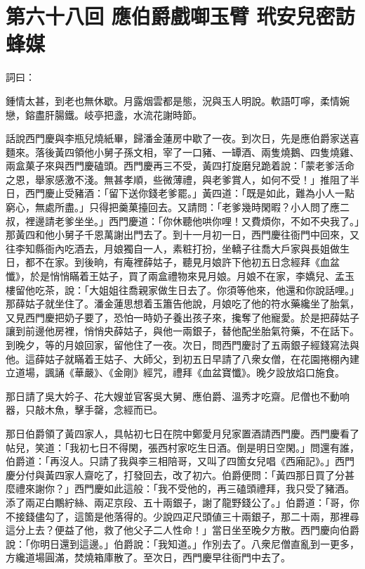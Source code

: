 
\chapter*{第六十八回 應伯爵戲啣玉臂 玳安兒密訪蜂媒}


詞曰：

\begin{myquote} 
鍾情太甚，到老也無休歇。月露烟雲都是態，況與玉人明說。軟語叮嚀，柔情婉戀，鎔盡肝腸鐵。岐亭把盞，水流花謝時節。

\end{myquote} 

話說西門慶與李瓶兒燒紙畢，歸潘金蓮房中歇了一夜。到次日，先是應伯爵家送喜麵來。落後黃四領他小舅子孫文相，宰了一口豬、一罈酒、兩隻燒鵝、四隻燒雞、兩盒菓子來與西門慶磕頭。西門慶再三不受，黃四打旋磨兒跪着說：「蒙老爹活命之恩，舉家感激不淺。無甚孝順，些微薄禮，與老爹賞人，如何不受！」推阻了半日，西門慶止受豬酒：「留下送你錢老爹罷。」黃四道：「既是如此，難為小人一點窮心，無處所盡。」只得把羹菓擡回去。又請問：「老爹幾時閑暇？小人問了應二叔，裡邊請老爹坐坐。」西門慶道：「你休聽他哄你哩！又費煩你，不如不央我了。」那黃四和他小舅子千恩萬謝出門去了。到十一月初一日，西門慶往衙門中回來，又往李知縣衙內吃酒去，月娘獨自一人，素粧打扮，坐轎子往喬大戶家與長姐做生日，都不在家。到後晌，有庵裡薛姑子，聽見月娘許下他初五日念經拜《血盆懺》，於是悄悄瞞着王姑子，買了兩盒禮物來見月娘。月娘不在家，李嬌兒、孟玉樓留他吃茶，說：「大姐姐往喬親家做生日去了。你須等他來，他還和你說話哩。」那薛姑子就坐住了。潘金蓮思想着玉簫告他說，月娘吃了他的符水藥纔坐了胎氣，又見西門慶把奶子要了，恐怕一時奶子養出孩子來，攙奪了他寵愛。於是把薛姑子讓到前邊他房裡，悄悄央薛姑子，與他一兩銀子，替他配坐胎氣符藥，不在話下。到晚夕，等的月娘回家，留他住了一夜。次日，問西門慶討了五兩銀子經錢寫法與他。這薛姑子就瞞着王姑子、大師父，到初五日早請了八衆女僧，在花園捲棚內建立道場，諷誦《華嚴》、《金剛》經咒，禮拜《血盆寶懺》。晚夕設放焰口施食。

那日請了吳大妗子、花大嫂並官客吳大舅、應伯爵、溫秀才吃齋。尼僧也不動响器，只敲木魚，擊手罄，念經而已。

那日伯爵領了黃四家人，具帖初七日在院中鄭愛月兒家置酒請西門慶。西門慶看了帖兒，笑道：「我初七日不得閑，張西村家吃生日酒。倒是明日空閑。」{}問還有誰，伯爵道：「再沒人。只請了我與李三相陪哥，又叫了四箇女兒唱《西廂記》。」西門慶分付與黃四家人齋吃了，打發回去，改了初六。伯爵便問：「黃四那日買了分甚麼禮來謝你？」西門慶如此這般：「我不受他的，再三磕頭禮拜，我只受了豬酒。添了兩疋白鷳紵絲、兩疋京段、五十兩銀子，謝了龍野錢公了。」伯爵道：「哥，你不接錢儘勾了，這箇是他落得的。少說四疋尺頭値三十兩銀子，那二十兩，那裡尋這分上去？便益了他，救了他父子二人性命！」當日坐至晚夕方散。西門慶向伯爵說：「你明日還到這邊。」伯爵說：「我知道。」作別去了。八衆尼僧直亂到一更多，方纔道場圓滿，焚燒箱庫散了。至次日，西門慶早往衙門中去了。

